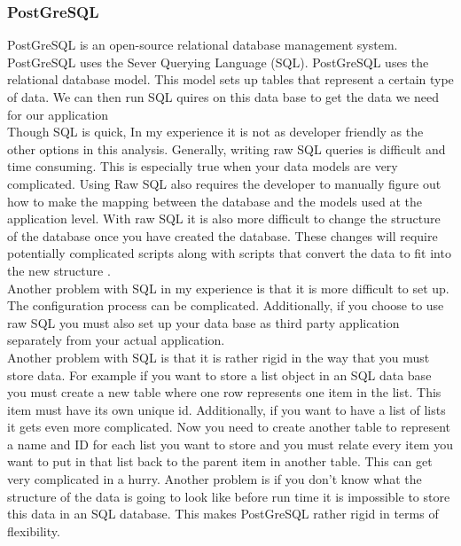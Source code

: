 \documentclass[onecolumn, draftclsnofoot,10pt, compsoc]{article}
\begin{document}
		\subsubsection{PostGreSQL}
				PostGreSQL is an open-source relational database management system. PostGreSQL uses the Sever Querying Language (SQL). PostGreSQL uses the relational database model. This model sets up tables that represent a certain type of data. We can then run SQL quires on this data base to get the data we need for our application \cite{IEEEexample:WhatIsPostgreSQL}\\
				Though SQL is quick, In my experience it is not as developer friendly as the other options in this analysis. Generally, writing raw SQL queries is difficult and time consuming. This is especially true when your data models are very complicated. Using Raw SQL also requires the developer to manually figure out how to make the mapping between the database and the models used at the application level. With raw SQL it is also more difficult to change the structure of the database once you have created the database. These changes will require potentially complicated scripts along with scripts that convert the data to fit into the new structure \cite{IEEEexample:MongoDBvsSQL}.\\
				Another problem with SQL in my experience is that it is more difficult to set up. The configuration process can be complicated. Additionally, if you choose to use raw SQL you must also set up your data base as third party application separately from your actual application.\\
				Another problem with SQL is that it is rather rigid in the way that you must store data. For example if you want to store a list object in an SQL data base you must create a new table where one row represents one item in the list. This item must have its own unique id. Additionally, if you want to have a list of lists it gets even more complicated. Now you need to create another table to represent a name and ID for each list you want to store and you must relate every item you want to put in that list back to the parent item in another table. This can get very complicated in a hurry. Another problem is if you don't know what the structure of the data is going to look like before run time it is impossible to store this data in an SQL database. This makes PostGreSQL rather rigid in terms of flexibility.\\
\end{document}
